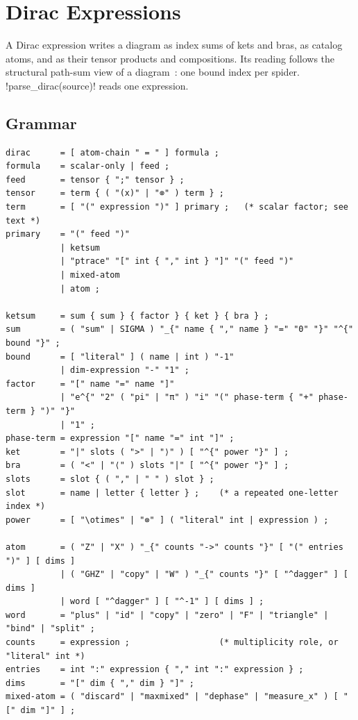 \section{Dirac Expressions}\label{sec:language-dirac}

A Dirac expression writes a diagram as index sums of kets and bras, as catalog atoms, and as their tensor products and compositions. Its reading follows the structural path-sum view of a diagram~\cite{amy2018pathsums}: one bound index per spider. \py!parse_dirac(source)! reads one expression.

\subsection{Grammar}\label{sec:language-dirac-grammar}

\begin{lstlisting}[style=grammar,caption={Dirac expression grammar.},label={lst:language-dirac}]
dirac      = [ atom-chain " = " ] formula ;
formula    = scalar-only | feed ;
feed       = tensor { ";" tensor } ;
tensor     = term { ( "(x)" | "⊗" ) term } ;
term       = [ "(" expression ")" ] primary ;   (* scalar factor; see text *)
primary    = "(" feed ")"
           | ketsum
           | "ptrace" "[" int { "," int } "]" "(" feed ")"
           | mixed-atom
           | atom ;

ketsum     = sum { sum } { factor } { ket } { bra } ;
sum        = ( "sum" | SIGMA ) "_{" name { "," name } "=" "0" "}" "^{" bound "}" ;
bound      = [ "literal" ] ( name | int ) "-1"
           | dim-expression "-" "1" ;
factor     = "[" name "=" name "]"
           | "e^{" "2" ( "pi" | "π" ) "i" "(" phase-term { "+" phase-term } ")" "}"
           | "1" ;
phase-term = expression "[" name "=" int "]" ;
ket        = "|" slots ( ">" | "⟩" ) [ "^{" power "}" ] ;
bra        = ( "<" | "⟨" ) slots "|" [ "^{" power "}" ] ;
slots      = slot { ( "," | " " ) slot } ;
slot       = name | letter { letter } ;    (* a repeated one-letter index *)
power      = [ "\otimes" | "⊗" ] ( "literal" int | expression ) ;

atom       = ( "Z" | "X" ) "_{" counts "->" counts "}" [ "(" entries ")" ] [ dims ]
           | ( "GHZ" | "copy" | "W" ) "_{" counts "}" [ "^dagger" ] [ dims ]
           | word [ "^dagger" ] [ "^-1" ] [ dims ] ;
word       = "plus" | "id" | "copy" | "zero" | "F" | "triangle" | "bind" | "split" ;
counts     = expression ;                  (* multiplicity role, or "literal" int *)
entries    = int ":" expression { "," int ":" expression } ;
dims       = "[" dim { "," dim } "]" ;
mixed-atom = ( "discard" | "maxmixed" | "dephase" | "measure_x" ) [ "[" dim "]" ] ;
\end{lstlisting}

